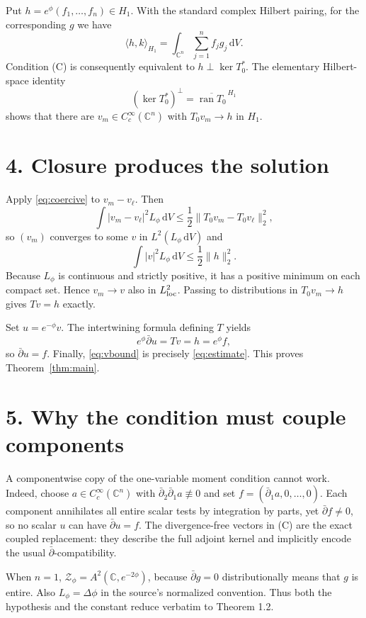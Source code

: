 \documentclass[10pt,a4paper]{article}
\newcommand{\C}{\mathbb C}
\newcommand{\dd}{\,\mathrm d}
\newcommand{\dbar}{\bar\partial}
\newcommand{\ip}[2]{\langle #1,#2\rangle}
\begin{document}
Put $h=e^\phi(f_1,\ldots,f_n)\in H_1$.  With the standard complex Hilbert
pairing, for the corresponding $g$ we have
\[
 \ip{h}{k}_{H_1}
 =\int_{\C^n}\sum_{j=1}^nf_jg_j\dd V.
\]
Condition (C) is consequently equivalent to $h\perp\ker T_0^*$.  The
elementary Hilbert-space identity
\begin{equation}\label{eq:range}
 (\ker T_0^*)^\perp=\overline{\operatorname{ran}T_0}^{\,H_1}
\end{equation}
shows that there are $v_m\in C_c^\infty(\C^n)$ with $T_0v_m\to h$ in
$H_1$.

\section*{4. Closure produces the solution}

Apply \eqref{eq:coercive} to $v_m-v_\ell$.  Then
\[
 \int|v_m-v_\ell|^2L_\phi\dd V
 \le\frac12\|T_0v_m-T_0v_\ell\|_2^2,
\]
so $(v_m)$ converges to some $v$ in $L^2(L_\phi\dd V)$ and
\begin{equation}\label{eq:vbound}
 \int|v|^2L_\phi\dd V\le\frac12\|h\|_2^2.
\end{equation}
Because $L_\phi$ is continuous and strictly positive, it has a positive
minimum on each compact set.  Hence $v_m\to v$ also in $L^2_{\rm loc}$.
Passing to distributions in $T_0v_m\to h$ gives $Tv=h$ exactly.

Set $u=e^{-\phi}v$.  The intertwining formula defining $T$ yields
\[
 e^\phi\dbar u=Tv=h=e^\phi f,
\]
so $\dbar u=f$.  Finally, \eqref{eq:vbound} is precisely
\eqref{eq:estimate}.  This proves Theorem~\ref{thm:main}.

\section*{5. Why the condition must couple components}

A componentwise copy of the one-variable moment condition cannot work.
Indeed, choose $a\in C_c^\infty(\C^n)$ with
$\dbar_2\dbar_1a\not\equiv0$ and set
$f=(\dbar_1a,0,\ldots,0)$.  Each component annihilates all entire scalar
tests by integration by parts, yet $\dbar f\ne0$, so no scalar $u$ can have
$\dbar u=f$.  The divergence-free vectors in (C) are the exact coupled
replacement: they describe the full adjoint kernel and implicitly encode
the usual $\dbar$-compatibility.

When $n=1$, $\mathcal Z_\phi=A^2(\C,e^{-2\phi})$, because
$\dbar g=0$ distributionally means that $g$ is entire.  Also
$L_\phi=\Delta\phi$ in the source's normalized convention.  Thus both the
hypothesis and the constant reduce verbatim to Theorem 1.2.
\end{document}
